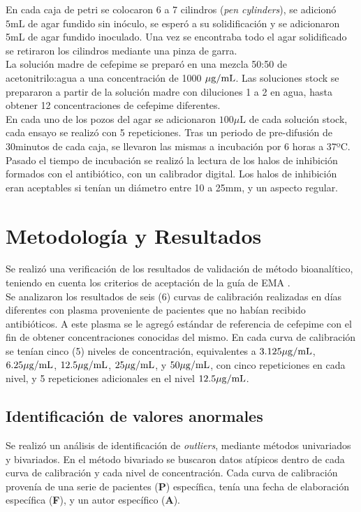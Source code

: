 \documentclass{article}
\begin{document}
\noindent
En cada caja de petri se colocaron 6 a 7 cilindros (\textit{pen cylinders}), se adicionó $5\textrm{mL}$ de agar fundido sin inóculo, se esperó a su solidificación y se adicionaron 5mL de agar fundido inoculado. Una vez se encontraba todo el agar solidificado se retiraron los cilindros mediante una pinza de garra. \\

\noindent
La solución madre de cefepime se preparó en una mezcla 50:50 de acetonitrilo:agua a una concentración de 1000 $\mathrm{\mu g/mL}$. Las soluciones stock se prepararon a partir de la solución madre con diluciones 1 a 2 en agua, hasta obtener 12 concentraciones de cefepime diferentes. \\

\noindent
En cada uno de los pozos del agar se adicionaron $100\mu\textrm{L}$ de cada solución stock, cada ensayo se realizó con 5 repeticiones. Tras un periodo de pre-difusión de 30minutos de cada caja, se llevaron las mismas a incubación por 6 horas a 37ºC. Pasado el tiempo de incubación se realizó la lectura de los halos de inhibición formados con el antibiótico, con un calibrador digital. Los halos de inhibición eran aceptables si tenían un diámetro entre 10 a 25mm, y un aspecto regular. 

\section{Metodología y Resultados} \label{Metodología y Resultados}
Se realizó una verificación de los resultados de validación de método bioanalítico, teniendo en cuenta los criterios de aceptación de la guía de EMA \cite{EMA2012}. \\

\noindent
Se analizaron los resultados de seis (6) curvas de calibración realizadas en días diferentes con plasma proveniente de pacientes que no habían recibido antibióticos. A este plasma se le agregó estándar de referencia de cefepime con el fin de obtener concentraciones conocidas del mismo. En cada curva de calibración se tenían cinco (5) niveles de concentración, equivalentes a $3.125 \mathrm{\mu g/mL}$, $6.25 \mathrm{\mu g/mL}$, $12.5 \mathrm{\mu g/mL}$, $25 \mathrm{\mu g/mL}$, y $50 \mathrm{\mu g/mL}$, con cinco repeticiones en cada nivel, y 5 repeticiones adicionales en el nivel $12.5 \mathrm{\mu g/mL}$. \\

\subsection{Identificación de valores anormales}
Se realizó un análisis de identificación de \textit{outliers}, mediante métodos univariados y bivariados. En el método bivariado se buscaron datos atípicos dentro de cada curva de calibración y cada nivel de concentración. Cada curva de calibración provenía de una serie de pacientes (\textbf{P}) específica, tenía una fecha de elaboración específica (\textbf{F}), y un autor específico (\textbf{A}). \\
\end{document}
